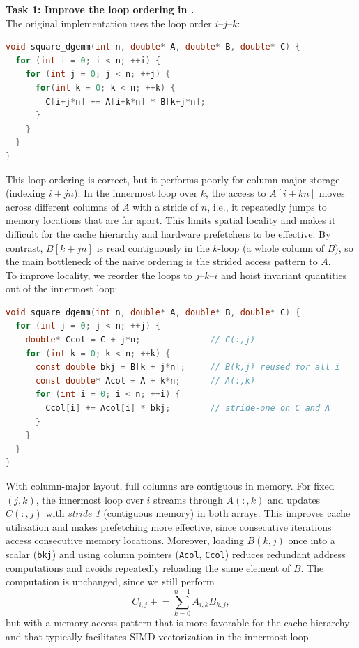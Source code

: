 \documentclass[unicode,10pt,a4paper,oneside,numbers=endperiod,openany]{scrartcl}
\begin{document}
\textbf{Task 1: Improve the loop ordering in .}\\
The original implementation uses the loop order $i$--$j$--$k$:
\begin{lstlisting}[style=grayverbatim,language=C]
void square_dgemm(int n, double* A, double* B, double* C) {
  for (int i = 0; i < n; ++i) {
    for (int j = 0; j < n; ++j) {
      for(int k = 0; k < n; ++k) {
        C[i+j*n] += A[i+k*n] * B[k+j*n];
      }
    }
  }
}
\end{lstlisting}
This loop ordering is correct, but it performs poorly for column-major storage (indexing $i + jn$). 
In the innermost loop over $k$, the access to $A[i + k n]$ moves across different columns of $A$ with a stride of $n$, i.e., it repeatedly jumps to memory locations that are far apart. 
This limits spatial locality and makes it difficult for the cache hierarchy and hardware prefetchers to be effective. 
By contrast, $B[k + jn]$ is read contiguously in the $k$-loop (a whole column of $B$), so the main bottleneck of the naive ordering is the strided access pattern to $A$.\\

To improve locality, we reorder the loops to $j$--$k$--$i$ and hoist invariant quantities out of the innermost loop:
\begin{lstlisting}[style=grayverbatim,language=C]
void square_dgemm(int n, double* A, double* B, double* C) {
  for (int j = 0; j < n; ++j) {
    double* Ccol = C + j*n;              // C(:,j)
    for (int k = 0; k < n; ++k) {
      const double bkj = B[k + j*n];     // B(k,j) reused for all i
      const double* Acol = A + k*n;      // A(:,k)
      for (int i = 0; i < n; ++i) {
        Ccol[i] += Acol[i] * bkj;        // stride-one on C and A
      }
    }
  }
}
\end{lstlisting}

With column-major layout, full columns are contiguous in memory. For fixed $(j,k)$, the innermost loop over $i$ streams through $A(:,k)$ and updates $C(:,j)$ with \emph{stride 1} (contiguous memory) in both arrays. 
This improves cache utilization and makes prefetching more effective, since consecutive iterations access consecutive memory locations. 
Moreover, loading $B(k,j)$ once into a scalar (\texttt{bkj}) and using column pointers (\texttt{Acol}, \texttt{Ccol}) reduces redundant address computations and avoids repeatedly reloading the same element of $B$. 
The computation is unchanged, since we still perform
\[
C_{i,j} \mathrel{+}= \sum_{k=0}^{n-1} A_{i,k} B_{k,j},
\]
but with a memory-access pattern that is more favorable for the cache hierarchy and that typically facilitates SIMD vectorization in the innermost loop.\\[0.5em]
\end{document}
